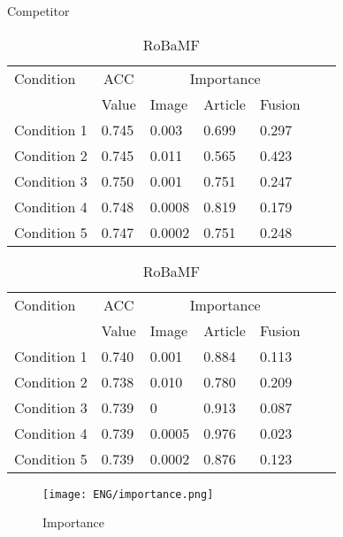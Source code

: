 \documentclass{article}
\begin{document}
\begin{table}[htbp]
\centering
\begin{minipage}[t]{0.45\textwidth}
\centering
\caption{Competitor}
\label{tab:competitor}
\begin{tabular}{@{}lllllll@{}}
\toprule
Condition       & \multicolumn{1}{c|}{ACC} & \multicolumn{3}{c}{Importance} \\
             & Value      & Image      & Article      & Fusion     \\
\midrule
Condition 1   & 0.745         & 0.003         & 0.699         & 0.297       \\
Condition 2   & 0.745         & 0.011         & 0.565         & 0.423       \\
Condition 3   & 0.750         & 0.001         & 0.751         & 0.247       \\
Condition 4   & 0.748         & 0.0008        & 0.819         & 0.179       \\
Condition 5   & 0.747         & 0.0002        & 0.751         & 0.248       \\
\bottomrule
\end{tabular}
\end{minipage}
\hfill
\begin{minipage}[t]{0.45\textwidth}
\centering
\caption{RoBaMF}
\label{tab:robamf}
\begin{tabular}{@{}lllllll@{}}
\toprule
Condition       & \multicolumn{1}{c|}{ACC} & \multicolumn{3}{c}{Importance} \\
             & Value      & Image      & Article      & Fusion     \\
\midrule
Condition 1   & 0.740         & 0.001         & 0.884         & 0.113       \\
Condition 2   & 0.738         & 0.010         & 0.780         & 0.209       \\
Condition 3   & 0.739         & 0              & 0.913         & 0.087       \\
Condition 4   & 0.739         & 0.0005        & 0.976         & 0.023       \\
Condition 5   & 0.739         & 0.0002        & 0.876         & 0.123       \\
\bottomrule
\end{tabular}
\end{minipage}
\end{table}


\begin{figure}[ht]
    \centering
    \texttt{[image: ENG/importance.png]}
    \caption{Importance}
    \label{fig.last}
\end{figure}
\end{document}
